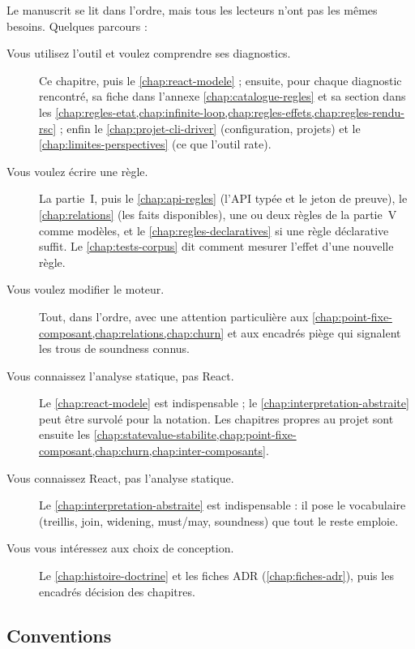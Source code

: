 Le manuscrit se lit dans l'ordre, mais tous les lecteurs n'ont pas les mêmes
besoins. Quelques parcours :

\begin{description}
  \item[Vous utilisez l'outil et voulez comprendre ses diagnostics.] Ce
    chapitre, puis le \cref{chap:react-modele} ; ensuite, pour chaque
    diagnostic rencontré, sa fiche dans l'annexe \ref{chap:catalogue-regles}
    et sa section dans les \cref{chap:regles-etat,chap:infinite-loop,chap:regles-effets,chap:regles-rendu-rsc} ;
    enfin le \cref{chap:projet-cli-driver} (configuration, projets) et le
    \cref{chap:limites-perspectives} (ce que l'outil rate).
  \item[Vous voulez écrire une règle.] La partie~I, puis le
    \cref{chap:api-regles} (l'API typée et le jeton de preuve), le
    \cref{chap:relations} (les faits disponibles), une ou deux règles de la
    partie~V comme modèles, et le \cref{chap:regles-declaratives} si une règle
    déclarative suffit. Le \cref{chap:tests-corpus} dit comment mesurer
    l'effet d'une nouvelle règle.
  \item[Vous voulez modifier le moteur.] Tout, dans l'ordre, avec une
    attention particulière aux \cref{chap:point-fixe-composant,chap:relations,chap:churn}
    et aux encadrés \og piège\fg{} qui signalent les trous de soundness
    connus.
  \item[Vous connaissez l'analyse statique, pas React.] Le
    \cref{chap:react-modele} est indispensable ; le
    \cref{chap:interpretation-abstraite} peut être survolé pour la notation.
    Les chapitres propres au projet sont ensuite les
    \cref{chap:statevalue-stabilite,chap:point-fixe-composant,chap:churn,chap:inter-composants}.
  \item[Vous connaissez React, pas l'analyse statique.] Le
    \cref{chap:interpretation-abstraite} est indispensable : il pose le
    vocabulaire (treillis, join, widening, must/may, soundness) que tout le
    reste emploie.
  \item[Vous vous intéressez aux choix de conception.] Le
    \cref{chap:histoire-doctrine} et les fiches ADR (\cref{chap:fiches-adr}),
    puis les encadrés \og décision\fg{} des chapitres.
\end{description}

\subsection{Conventions}

